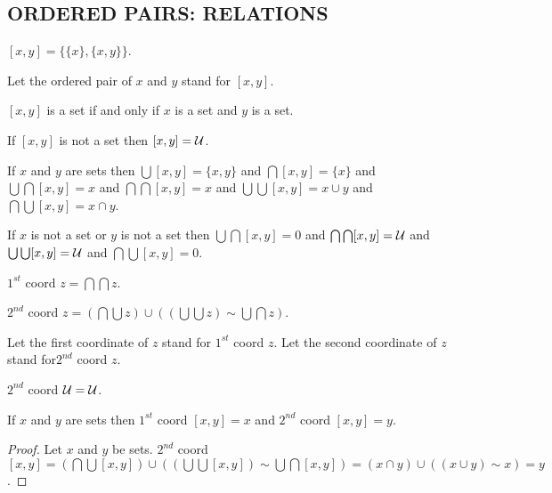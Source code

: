 \documentclass[a4paper,draft]{amsproc}
\begin{document}
\begin{forthel}
\section{ORDERED PAIRS: RELATIONS}

\begin{definition} $[x,y] = \{\{x\},\{x,y\}\}$.\end{definition}
Let the ordered pair of $x$ and $y$ stand for $[x,y]$.

\begin{theorem}
$[x,y]$ is a set if and only if $x$ is a set and $y$ is a set.
\end{theorem}

\begin{theorem}
If $[x,y]$ is not a set then $[x,y] = \cal{U}$.
\end{theorem}

\begin{theorem}
If $x$ and $y$ are sets then 
  $\bigcup [x,y] = \{x,y\}$ and
  $\bigcap [x,y] = \{x\}$ and
  $\bigcup \bigcap [x,y] = x$ and
  $\bigcap \bigcap [x,y] = x$ and
  $\bigcup \bigcup [x,y] = x \cup y$ and
  $\bigcap \bigcup [x,y] = x \cap y$.
\end{theorem}

\begin{theorem}
If $x$ is not a set or $y$ is not a set then
  $\bigcup \bigcap [x,y] = 0$ and
  $\bigcap \bigcap [x,y] = \cal{U}$ and
  $\bigcup \bigcup [x,y] = \cal{U}$ and
  $\bigcap \bigcup [x,y] = 0$.
\end{theorem}

\begin{definition} $1^{st}$ coord $z = \bigcap \bigcap z$.\end{definition}

\begin{definition} $2^{nd}$ coord $z = (\bigcap \bigcup z) \cup 
((\bigcup \bigcup z) \sim \bigcup \bigcap z)$.\end{definition} 
Let the first coordinate of $z$ stand for $1^{st}$ coord $z$.
Let the second coordinate of $z$ stand for$2^{nd}$ coord $z$.

\begin{theorem}
$2^{nd}$ coord $\cal{U} = \cal{U}$.
\end{theorem}

\begin{theorem}
If $x$ and $y$ are sets 
then $1^{st}$ coord $[x,y] = x$ and $2^{nd}$ coord $[x,y] = y$.
\end{theorem}
\begin{proof}
Let $x$ and $y$ be sets.
$2^{nd}$ coord $[x,y] = (\bigcap \bigcup [x,y]) \cup 
((\bigcup \bigcup [x,y]) \sim \bigcup \bigcap [x,y])
= (x \cap y) \cup ((x \cup y) \sim x)
= y$.
\end{proof}


\end{forthel}
\end{document}
